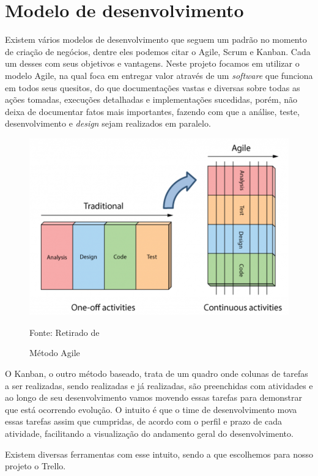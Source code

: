 \documentclass[../../layout.tex]{subfiles}
\begin{document}
\section{Modelo de desenvolvimento}
\hspace*{3em}Existem vários modelos de desenvolvimento que seguem um padrão no momento de criação de negócios, dentre eles podemos citar o Agile, Scrum e Kanban. Cada um desses com seus objetivos e vantagens. Neste projeto focamos em utilizar o modelo Agile, na qual foca em entregar valor através de um \emph{software} que funciona em todos seus quesitos, do que documentações vastas e diversas sobre todas as ações tomadas, execuções detalhadas e implementações sucedidas, porém, não deixa de documentar fatos mais importantes, fazendo com que a análise, teste, desenvolvimento e \emph{design} sejam realizados em paralelo. 

\begin{figure}[H]
\centering
\caption{Método Agile}
\includegraphics[width=1\textwidth]{assets/static/img/agile.jpg}
\label{fig:i2c_structure}

\begin{minipage}{0.5\textwidth}
\raggedright \footnotesize Fonte: Retirado de 
\end{minipage}
\end{figure}

\hspace*{3em}O Kanban, o outro método baseado, trata de um quadro onde colunas de tarefas a ser realizadas, sendo realizadas e já realizadas, são preenchidas com atividades e ao longo de seu desenvolvimento vamos movendo essas tarefas para demonstrar que está ocorrendo evolução. O intuito é que o time de desenvolvimento mova essas tarefas assim que cumpridas, de acordo com o perfil e prazo de cada atividade, facilitando a visualização do andamento geral do desenvolvimento. \par
\hspace*{3em}Existem diversas ferramentas com esse intuito, sendo a que escolhemos para nosso projeto o Trello.
\end{document}
